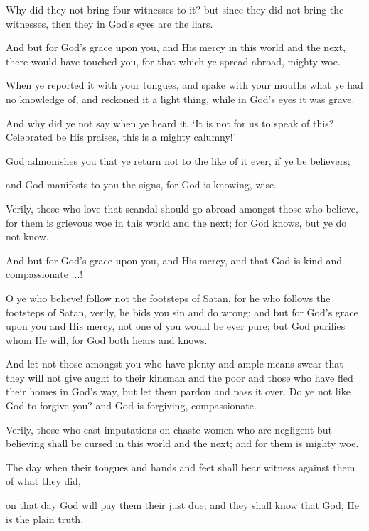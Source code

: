 \documentclass[fontsize=14pt, letterpaper, notitlepage, openany, DIV=12]{scrbook} %
\begin{document}
\noindent[24:13]
Why did they not bring four witnesses to it? but since they did not bring the witnesses,
then they in God's eyes are the liars.

\noindent[24:14]
And but for God's grace upon you, and His mercy in this world and the next, there would
have touched you, for that which ye spread abroad, mighty woe.

\noindent[24:15]
When ye reported it with your tongues, and spake with your mouths what ye had no
knowledge of, and reckoned it a light thing, while in God's eyes it was grave.

\noindent[24:16]
And why did ye not say when ye heard it, `It is not for us to speak of this? Celebrated be
His praises, this is a mighty calumny!'

\noindent[24:17]
God admonishes you that ye return not to the like of it ever, if ye be believers;

\noindent[24:18]
and God manifests to you the signs, for God is knowing, wise.

\noindent[24:19]
Verily, those who love that scandal should go abroad amongst those who believe, for
them is grievous woe in this world and the next; for God knows, but ye do not know.

\noindent[24:20]
And but for God's grace upon you, and His mercy, and that God is kind and
compassionate ...!

\noindent[24:21]
O ye who believe! follow not the footsteps of Satan, for he who follows the footsteps of
Satan, verily, he bids you sin and do wrong; and but for God's grace upon you and His mercy,
not one of you would be ever pure; but God purifies whom He will, for God both hears and
knows.

\noindent[24:22]
And let not those amongst you who have plenty and ample means swear that they will not
give aught to their kinsman and the poor and those who have fled their homes in God's way, but
let them pardon and pass it over. Do ye not like God to forgive you? and God is forgiving,
compassionate.

\noindent[24:23]
Verily, those who cast imputations on chaste women who are negligent but believing
shall be cursed in this world and the next; and for them is mighty woe.

\noindent[24:24]
The day when their tongues and hands and feet shall bear witness against them of what
they did,

\noindent[24:25]
on that day God will pay them their just due; and they shall know that God, He is the
plain truth.
\end{document}
